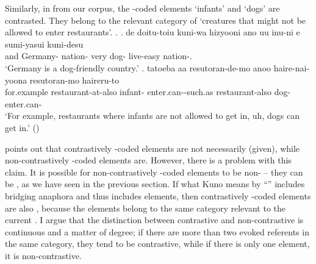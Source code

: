 Similarly, in \Next from our corpus,
the -coded elements  `infants' and  `dogs' are contrasted.
They belong to the relevant category of `creatures that might not be allowed to enter restaurants'.
%
\ex.
 \ag. de doitu-toiu kuni-wa hizyooni ano uu inu-ni e sumi-yasui kuni-desu \\
 	and Germany- nation- very   dog-  live-easy nation-. \\
	`Germany is a dog-friendly country.'
 \bg. tatoeba aa resutoran-de-mo anoo  haire-nai-yoona resutoran-mo  haireru-to \\
 	for.example  restaurant-at-also  infant- enter.can--such.as restaurant-also dog- enter.can- \\
 	`For example, restaurants where infants are not allowed to get in, uh, dogs can get in.'
	\hfill{()}


 points out that
contrastively -coded elements are not necessarily  (given),
while non-contrastively -coded elements are.
However, there is a problem with this claim.
It is possible for non-contrastively -coded elements to be non- --
they can be , as we have seen in the previous section.
If what Kuno means by ``'' includes bridging anaphora \cite{clark75} and thus includes  elements,
then contrastively -coded elements are also ,
because the elements belong to the same category relevant to the current .
I argue that the distinction between contrastive and non-contrastive is continuous and a matter of degree;
if there are more than two evoked referents in the same category,
they tend to be contrastive,
while if there is only one element,
it is non-contrastive.
%
%




